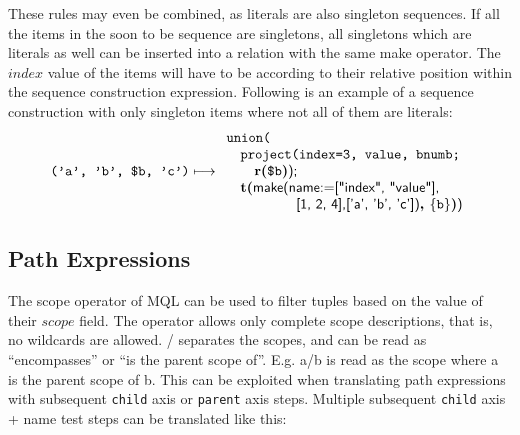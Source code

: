 These rules may even be combined, as literals are also singleton sequences. If all the items in the soon to 
be sequence are singletons, all singletons which are literals as well can be inserted into a relation with
the same \textsf{make} operator. The $index$ value of the items will have to be according to their relative 
position within the sequence construction expression. Following is an example of a sequence construction with
only singleton items where not all of them are literals:
\begin{equation*}
\mbox{\texttt{('a', 'b', \$b, 'c')}}\longmapsto
\begin{array}{l}
\mbox{\texttt{union(}} \\ \quad
\mbox{\texttt{project(index=3, value, bnumb;}} \\ \quad \quad
\mbox{\textbf{r(}}\texttt{\$b}\mbox{\textbf{)}\textsf{);}} \\ \quad
\mbox{\textbf{t(}}
\mbox{\textsf{make(name:=["index", "value"],}} \\ \quad \quad \quad \quad \quad 
\mbox{\textsf{[1, 2, 4],['a', 'b', 'c'])}\textbf{,
}}\{\mbox{\texttt{b}}\}\mbox{\textbf{)}\textsf{)}}
\end{array}
\end{equation*}
      

\subsection{Path Expressions}
\label{sect:trans:TD:simpl:pathExpr}
The \textsf{scope} operator of MQL can be used to filter tuples based on the value of their $scope$ field. The
operator allows only complete scope descriptions, that is, no wildcards are allowed. \textsf{/} separates the
scopes, and can be read as ``encompasses'' or ``is the parent scope of''. E.g. \textsf{a/b} is read as the scope
where \textsf{a} is the parent scope of \textsf{b}. This can be exploited when translating path expressions with
subsequent \texttt{child} axis or \texttt{parent} axis steps. Multiple subsequent \texttt{child} axis + name test
steps can be translated like this:

